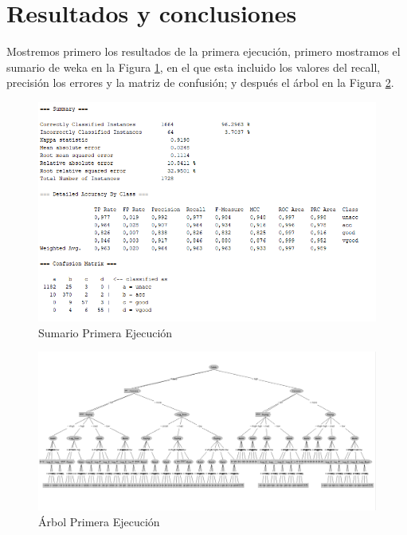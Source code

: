 \documentclass[a4paper, 11pt, twoside, openany, onecolumn, final]{memoir}
\begin{document}
	\section{Resultados y conclusiones}
	Mostremos primero los resultados de la primera ejecución, primero mostramos el sumario de weka en la Figura \ref{SumarioPrimeraEjecucion}, en el que esta incluido los valores del recall, precisión los errores y la matriz de confusión; y después el árbol en la Figura \ref{ArbolPrimeraEjecucion}.
	\begin{figure}
  		\centering
   		\includegraphics{Imagenes/SummarySinEntreNiVal}
  		\caption{Sumario Primera Ejecución}
  		\label{SumarioPrimeraEjecucion}
	\end{figure}	
	
	\begin{figure}
  		\centering
   		\includegraphics[width=1\textwidth]{Imagenes/ArbolSinEntreNiVal}
  		\caption{Árbol Primera Ejecución}
  		\label{ArbolPrimeraEjecucion}
	\end{figure}
	
\end{document}
